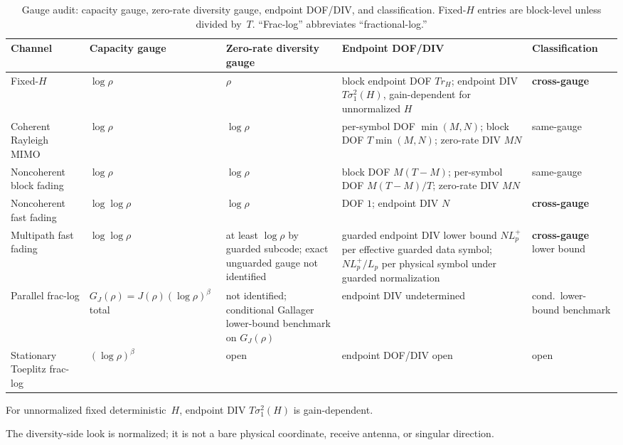 \documentclass[lettersize,onecolumn]{IEEEtran}
\newcommand{\snr}{\rho}
\begin{document}
\begin{table}[ht]
\centering
\caption{Gauge audit: capacity gauge, zero-rate diversity gauge,
endpoint DOF/DIV, and classification. Fixed-$H$ entries are
block-level unless divided by~$T$.
``Frac-log'' abbreviates ``fractional-log.''}
\label{tab:audit}
\footnotesize
\begin{tabular}{@{}p{2.8cm}lp{2.8cm}p{4.8cm}p{2.0cm}@{}}
\toprule
Channel & Capacity gauge & Zero-rate diversity gauge
& Endpoint DOF/DIV & Classification \\
\midrule
Fixed-$H$
& $\log\snr$ & $\snr$
& block endpoint DOF $Tr_H$; endpoint DIV
$T\sigma_1^2(H)$, gain-dependent for unnormalized $H$
& \textbf{cross-gauge} \\
Coherent Rayleigh MIMO
& $\log\snr$ & $\log\snr$
& per-symbol DOF $\min(M,N)$; block DOF $T\min(M,N)$; zero-rate
DIV $MN$
& same-gauge \\
Noncoherent block fading
& $\log\snr$ & $\log\snr$
& block DOF $M(T\!-\!M)$; per-symbol DOF $M(T\!-\!M)/T$; zero-rate
DIV $MN$
& same-gauge \\
Noncoherent fast fading
& $\log\log\snr$ & $\log\snr$
& DOF $1$; endpoint DIV $N$
& \textbf{cross-gauge} \\
Multipath fast fading
& $\log\log\snr$ & at least $\log\snr$ by guarded subcode; exact
unguarded gauge not identified
& guarded endpoint DIV lower bound $NL_p^+$ per effective
guarded data symbol; $NL_p^+/L_p$ per physical symbol under guarded
normalization
& \textbf{cross-gauge} lower bound \\
Parallel frac-log
& $G_J(\snr)\!=\!J(\snr)(\log\snr)^\beta$ total
& not identified; conditional Gallager lower-bound benchmark on
$G_J(\snr)$
& endpoint DIV undetermined
& cond.\ lower-bound benchmark \\
Stationary Toeplitz frac-log
& $(\log\snr)^\beta$ & open
& endpoint DOF/DIV open
& open \\
\bottomrule
\end{tabular}

\smallskip
For unnormalized fixed deterministic~$H$, endpoint DIV
$T\sigma_1^2(H)$ is gain-dependent.

The diversity-side look is normalized; it is not a bare physical
coordinate, receive antenna, or singular direction.
\end{table}
\end{document}
